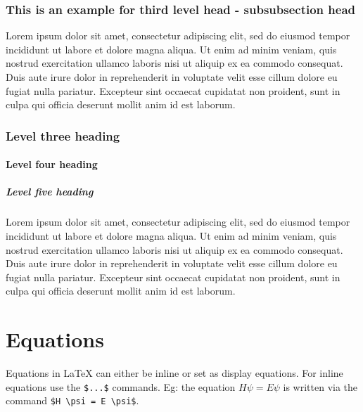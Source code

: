 \documentclass[unnumsec,webpdf,modern,large]{oup-authoring-template}%
\theoremstyle{thmstyleone}%
\theoremstyle{thmstyletwo}%
\theoremstyle{thmstylethree}%
\begin{document}
\subsubsection{This is an example for third level head - subsubsection head}\label{subsubsec2}

Lorem ipsum dolor sit amet, consectetur adipiscing elit, sed do eiusmod tempor incididunt ut labore et dolore magna aliqua. Ut enim ad minim veniam, quis nostrud exercitation ullamco laboris nisi ut aliquip ex ea commodo consequat. Duis aute irure dolor in reprehenderit in voluptate velit esse cillum dolore eu fugiat nulla pariatur. Excepteur sint occaecat cupidatat non proident, sunt in culpa qui officia deserunt mollit anim id est laborum.

\subsubsection{Level three heading}

\paragraph{Level four heading}

\subparagraph{Level five heading}

Lorem ipsum dolor sit amet, consectetur adipiscing elit, sed do eiusmod tempor incididunt ut labore et dolore magna aliqua. Ut enim ad minim veniam, quis nostrud exercitation ullamco laboris nisi ut aliquip ex ea commodo consequat. Duis aute irure dolor in reprehenderit in voluptate velit esse cillum dolore eu fugiat nulla pariatur. Excepteur sint occaecat cupidatat non proident, sunt in culpa qui officia deserunt mollit anim id est laborum.


\section{Equations}\label{sec4}

Equations in \LaTeX{} can either be inline or set as display equations. For
inline equations use the \verb+$...$+ commands. Eg: the equation
$H\psi = E \psi$ is written via the command \verb+$H \psi = E \psi$+.
\end{document}
